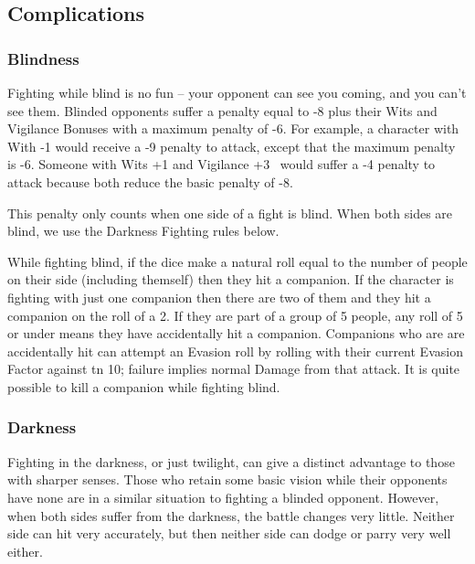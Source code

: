 \begin{multicols}{2}

\subsection{Complications}

\subsubsection{Blindness}

Fighting while blind is no fun -- your opponent can see you coming, and you can't see them. Blinded opponents suffer a penalty equal to -8 plus their Wits and Vigilance Bonuses with a maximum penalty of -6. For example, a character with With -1 would receive a -9 penalty to attack, except that the maximum penalty is -6. Someone with Wits +1 and Vigilance +3 \ would suffer a -4 penalty to attack because both reduce the basic penalty of -8.

This penalty only counts when one side of a fight is blind. When both sides are blind, we use the Darkness Fighting rules below.

While fighting blind, if the dice make a \gls{natural} roll equal to the number of people on their side (including themself) then they hit a companion. If the character is fighting with just one companion then there are two of them and they hit a companion on the roll of a 2. If they are part of a group of 5 people, any roll of 5 or under means they have accidentally hit a companion. Companions who are are accidentally hit can attempt an Evasion roll by rolling with their current Evasion Factor against \gls{tn} 10; failure implies normal Damage from that attack. It is quite possible to kill a companion while fighting blind.

\subsubsection{Darkness}\label{darkness}

Fighting in the darkness, or just twilight, can give a distinct advantage to those with sharper senses.
Those who retain some basic vision while their opponents have none are in a similar situation to fighting a blinded opponent.
However, when both sides suffer from the darkness, the battle changes very little.
Neither side can hit very accurately, but then neither side can dodge or parry very well either.


\end{multicols}
